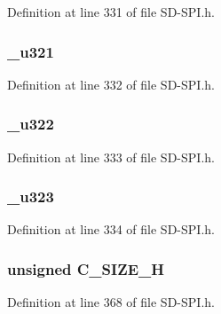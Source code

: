 Definition at line 331 of file S\+D-\/\+S\+P\+I.\+h.

\hypertarget{union_c_s_d_afcfcec75ab1ad51ac055518c4e4481b1}{}
\subsubsection[{\+\_\+u321}]{ \+\_\+u321}\label{union_c_s_d_afcfcec75ab1ad51ac055518c4e4481b1}


Definition at line 332 of file S\+D-\/\+S\+P\+I.\+h.

\hypertarget{union_c_s_d_a35670bdcd4d10351e71df6cd3d3ac95b}{}
\subsubsection[{\+\_\+u322}]{ \+\_\+u322}\label{union_c_s_d_a35670bdcd4d10351e71df6cd3d3ac95b}


Definition at line 333 of file S\+D-\/\+S\+P\+I.\+h.

\hypertarget{union_c_s_d_a48410d35cd59cf3964706daf7c80d8fa}{}
\subsubsection[{\+\_\+u323}]{ \+\_\+u323}\label{union_c_s_d_a48410d35cd59cf3964706daf7c80d8fa}


Definition at line 334 of file S\+D-\/\+S\+P\+I.\+h.

\hypertarget{union_c_s_d_ac817866417814f12dc2543928e8e7c33}{}
\subsubsection[{C\+\_\+\+S\+I\+Z\+E\+\_\+\+H}]{\setlength{\rightskip}{0pt plus 5cm}unsigned C\+\_\+\+S\+I\+Z\+E\+\_\+\+H}\label{union_c_s_d_ac817866417814f12dc2543928e8e7c33}


Definition at line 368 of file S\+D-\/\+S\+P\+I.\+h.

